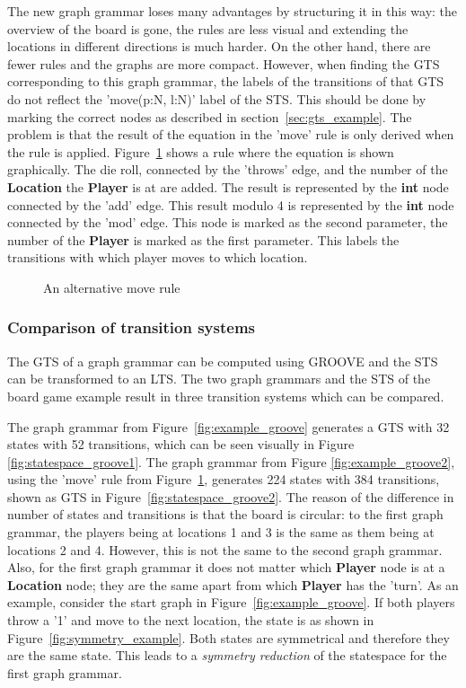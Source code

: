 The new graph grammar loses many advantages by structuring it in this way: the overview of the board is gone, the rules are less visual and extending the locations in different directions is much harder. On the other hand, there are fewer rules and the graphs are more compact. However, when finding the GTS corresponding to this graph grammar, the labels of the transitions of that GTS do not reflect the 'move(p:N, l:N)' label of the STS. This should be done by marking the correct nodes as described in section~\ref{sec:gts_example}. The problem is that the result of the equation in the 'move' rule is only derived when the rule is applied. Figure~\ref{fig:move3} shows a rule where the equation is shown graphically. The die roll, connected by the 'throws' edge, and the number of the \textbf{Location} the \textbf{Player} is at are added. The result is represented by the \textbf{int} node connected by the 'add' edge. This result modulo 4 is represented by the \textbf{int} node connected by the 'mod' edge. This node is marked as the second parameter, the number of the \textbf{Player} is marked as the first parameter. This labels the transitions with which player moves to which location.

\begin{figure}[ht]
  \begin{center}
    
  \end{center}
  \caption{An alternative move rule}
  \label{fig:move3}
\end{figure}

\subsubsection{Comparison of transition systems}
The GTS of a graph grammar can be computed using GROOVE and the STS can be transformed to an LTS. The two graph grammars and the STS of the board game example result in three transition systems which can be compared.

The graph grammar from Figure~\ref{fig:example_groove} generates a GTS with 32 states with 52 transitions, which can be seen visually in Figure~ \ref{fig:statespace_groove1}. The graph grammar from Figure \ref{fig:example_groove2}, using the 'move' rule from Figure~\ref{fig:move3}, generates 224 states with 384 transitions, shown as GTS in Figure~\ref{fig:statespace_groove2}. The reason of the difference in number of states and transitions is that the board is circular: to the first graph grammar, the players being at locations 1 and 3 is the same as them being at locations 2 and 4. However, this is not the same to the second graph grammar. Also, for the first graph grammar it does not matter which \textbf{Player} node is at a \textbf{Location} node; they are the same apart from which \textbf{Player} has the 'turn'. As an example, consider the start graph in Figure~\ref{fig:example_groove}. If both players throw a '1' and move to the next location, the state is as shown in Figure~\ref{fig:symmetry_example}. Both states are symmetrical and therefore they are the same state. This leads to a \textit{symmetry reduction} of the statespace for the first graph grammar.

